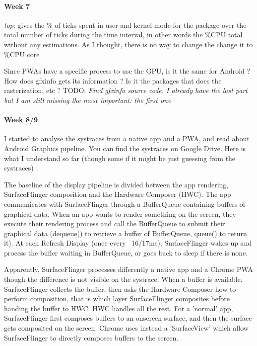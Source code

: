 \documentclass{kththesis}
\begin{document}
\paragraph{Week 7}
\textit{top}: gives the \% of ticks spent in user and kernel mode for the package over the total number of ticks during the time interval, in other words the \%CPU total without any estimations. As I thought, there is no way to change the change it to \%CPU core

Since PWAs have a specific process to use the GPU, is it the same for Android ? How does gfxinfo gets its information ? Is it the packages that does the rasterization, etc ?
\newline
TODO: \textit{Find gfxinfo source code. I already have the last part but I am still missing the most important: the first one}

\paragraph{Week 8/9}
I started to analyse the systraces from a native app and a PWA, and read about Android Graphics pipeline. You can find the systraces on Google Drive. Here is what I understand so far (though some if it might be just guessing from the systraces) : 

The baseline of the display pipeline is divided between the app rendering, SurfaceFlinger composition and the Hardware Composer (HWC). The app communicates with SurfaceFlinger through a BufferQueue containing buffers of graphical data. When an app wants to render something on the screen, they execute their rendering process and call the BufferQueue to submit their graphical data (dequeue() to retrieve a buffer of BufferQueue, queue() to return it). At each Refresh Display (once every ~16/17ms), SurfaceFlinger wakes up and process the buffer waiting in BufferQueue, or goes back to sleep if there is none. 

Apparently, SurfaceFlinger processes differently a native app and a Chrome PWA though the difference is not visible on the systrace. When a buffer is available, SurfaceFlinger collects the buffer, then asks the Hardware Composer how to perform composition, that is which layer SurfaceFlinger composites before handing the buffer to HWC. HWC handles all the rest. For a 'normal' app, SurfaceFlinger first composes buffers to an onscreen surface, and then the surface gets composited on the screen. Chrome uses instead a 'SurfaceView' which allow SurfaceFlinger to directly composes buffers to the screen.
\end{document}

